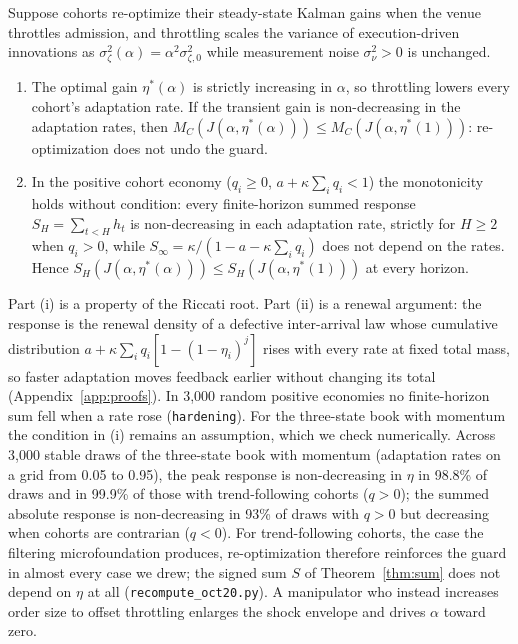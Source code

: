\begin{proposition}\label{prop:lucas}
Suppose cohorts re-optimize their steady-state Kalman gains when the venue throttles admission, and throttling scales the variance of execution-driven innovations as $\sigma_\zeta^2(\alpha)=\alpha^2\sigma_{\zeta,0}^2$ while measurement noise $\sigma_\nu^2>0$ is unchanged.
\begin{enumerate}[label=(\roman*)]
\item The optimal gain $\eta^*(\alpha)$ is strictly increasing in $\alpha$, so throttling lowers every cohort's adaptation rate. If the transient gain is non-decreasing in the adaptation rates, then $M_C(J(\alpha,\eta^*(\alpha)))\le M_C(J(\alpha,\eta^*(1)))$: re-optimization does not undo the guard.
\item In the positive cohort economy ($q_i\ge0$, $a+\kappa\sum_iq_i<1$) the monotonicity holds without condition: every finite-horizon summed response $S_H=\sum_{t<H}h_t$ is non-decreasing in each adaptation rate, strictly for $H\ge2$ when $q_i>0$, while $S_\infty=\kappa/(1-a-\kappa\sum_iq_i)$ does not depend on the rates. Hence $S_H(J(\alpha,\eta^*(\alpha)))\le S_H(J(\alpha,\eta^*(1)))$ at every horizon.
\end{enumerate}
\end{proposition}

Part (i) is a property of the Riccati root. Part (ii) is a renewal argument: the response is the renewal density of a defective inter-arrival law whose cumulative distribution $a+\kappa\sum_iq_i[1-(1-\eta_i)^j]$ rises with every rate at fixed total mass, so faster adaptation moves feedback earlier without changing its total (Appendix~\ref{app:proofs}). In 3{,}000 random positive economies no finite-horizon sum fell when a rate rose (\texttt{hardening}). For the three-state book with momentum the condition in (i) remains an assumption, which we check numerically. Across 3{,}000 stable draws of the three-state book with momentum (adaptation rates on a grid from 0.05 to 0.95), the peak response is non-decreasing in $\eta$ in 98.8\% of draws and in 99.9\% of those with trend-following cohorts ($q>0$); the summed absolute response is non-decreasing in 93\% of draws with $q>0$ but decreasing when cohorts are contrarian ($q<0$). For trend-following cohorts, the case the filtering microfoundation produces, re-optimization therefore reinforces the guard in almost every case we drew; the signed sum $S$ of Theorem~\ref{thm:sum} does not depend on $\eta$ at all (\texttt{recompute\_oct20.py}). A manipulator who instead increases order size to offset throttling enlarges the shock envelope and drives $\alpha$ toward zero.
